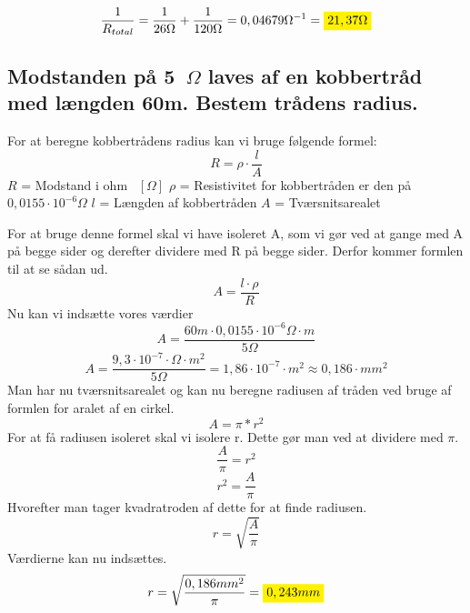 \begin{equation*}
    \frac{1}{R_{total}}=\frac{1}{26\Omega}+\frac{1}{120\Omega}=0,04679\Omega^{-1}=\mathcolorbox{yellow}{21,37\Omega}
\end{equation*}

\subsection{Modstanden på 5~$\Omega$ laves af en kobbertråd med længden 60m. Bestem trådens radius.}
For at beregne kobbertrådens radius kan vi bruge følgende formel:
\begin{equation*}
    R=\rho\cdot\frac{l}{A}
\end{equation*}
$R$ = Modstand i ohm ~$\left[ \Omega \right]$\newline
    $\rho$ = Resistivitet for kobbertråden er den på $0,0155 \cdot 10^{-6} \Omega$ \newline
    $l$ = Længden af kobbertråden\newline
    $A$ = Tværsnitsarealet\newline

For at bruge denne formel skal vi have isoleret A, som vi gør ved at gange med A på begge sider og derefter dividere med R på begge sider. Derfor kommer formlen til at se sådan ud.
\begin{equation*}
    A=\frac{l\cdot\rho}{R}
\end{equation*}
Nu kan vi indsætte vores værdier
\begin{equation*}
    A=\frac{60m\cdot0,0155 \cdot 10^{-6} \Omega \cdot m}{5\Omega}
\end{equation*}
\begin{equation*}
    A = \frac{9,3 \cdot 10^{-7} \cdot \Omega \cdot m^{2}}{5 \Omega} = 1,86 \cdot 10^{-7} \cdot m^{2} \approx 0,186 \cdot mm^{2}
\end{equation*}
Man har nu tværsnitsarealet og kan nu beregne radiusen af tråden ved bruge af formlen for aralet af en cirkel.
\begin{equation*}
    A=\pi*r^{2}
\end{equation*}
For at få radiusen isoleret skal vi isolere r. Dette gør man ved at dividere med $\pi$.
\begin{equation*}
    \frac{A}{\pi}=r^{2}
\end{equation*}
\begin{equation*}
    r^{2}=\frac{A}{\pi}
\end{equation*}
Hvorefter man tager kvadratroden af dette for at finde radiusen.
\begin{equation*}
    r=\sqrt{\frac{A}{\pi}}
\end{equation*}
Værdierne kan nu indsættes.
\begin{equation*}
    r=\sqrt{\frac{0,186mm^{2}}{\pi}} = \mathcolorbox{yellow}{0,243 mm}
\end{equation*}

